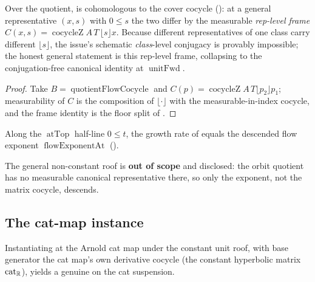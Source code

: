 \begin{theorem}\label{exists_flowCocycle_cohomologous_to_cover}
  \leanok
  Over the quotient,  is cohomologous to the cover cocycle
  (): at a general representative $(x,s)$ with $0 \le s$ the two differ
  by the measurable \emph{rep-level frame} $C(x,s) = \operatorname{cocycleZ} A\,T\,\lfloor s\rfloor
  x$. Because different representatives of one class carry different $\lfloor s\rfloor$, the issue's
  schematic \emph{class}-level conjugacy is provably impossible; the honest general statement is this
  rep-level frame, collapsing to the conjugation-free canonical identity at $\operatorname{unitFwd}$.
\end{theorem}
\begin{proof}\leanok
  Take $B = \operatorname{quotientFlowCocycle}$ and $C(p) = \operatorname{cocycleZ} A\,T
  \lfloor p_2\rfloor p_1$; measurability of $C$ is the composition of $\lfloor \cdot\rfloor$ with the
  measurable-in-index cocycle, and the frame identity is the floor split of .
\end{proof}

\begin{theorem}\label{flowExponentAt_quotientFlowCocycle}
  \leanok
  Along the $\operatorname{atTop}$ half-line $0 \le t$, the growth rate of 
  equals the descended flow exponent $\operatorname{flowExponentAt}$ ().
\end{theorem}

The general non-constant roof is \textbf{out of scope} and disclosed: the orbit quotient has no
measurable canonical representative there, so only the exponent, not the matrix cocycle, descends.

\subsection{The cat-map instance}

\begin{definition}\label{catQuotientFlowCocycle}
  \leanok
  Instantiating  at the Arnold cat map  under the constant
  unit roof, with base generator the cat map's own derivative cocycle (the constant hyperbolic
  matrix $\operatorname{cat}_{\mathbb{R}}$), yields a genuine  on the cat suspension.
\end{definition}

